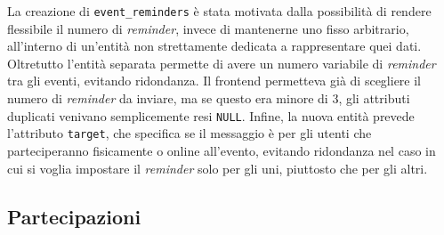 \noindent La creazione di \verb|event_reminders| è stata motivata dalla possibilità di rendere flessibile il numero di \emph{reminder}, invece di mantenerne uno fisso arbitrario, all'interno di un'entità non strettamente dedicata a rappresentare quei dati. Oltretutto l'entità separata permette di avere un numero variabile di \emph{reminder} tra gli eventi, evitando ridondanza. Il frontend permetteva già di scegliere il numero di \emph{reminder} da inviare, ma se questo era minore di 3, gli attributi duplicati venivano semplicemente resi \verb|NULL|. Infine, la nuova entità prevede l'attributo \verb|target|, che specifica se il messaggio è per gli utenti che parteciperanno fisicamente o online all'evento, evitando ridondanza nel caso in cui si voglia impostare il \emph{reminder} solo per gli uni, piuttosto che per gli altri.


\subsection{Partecipazioni}
